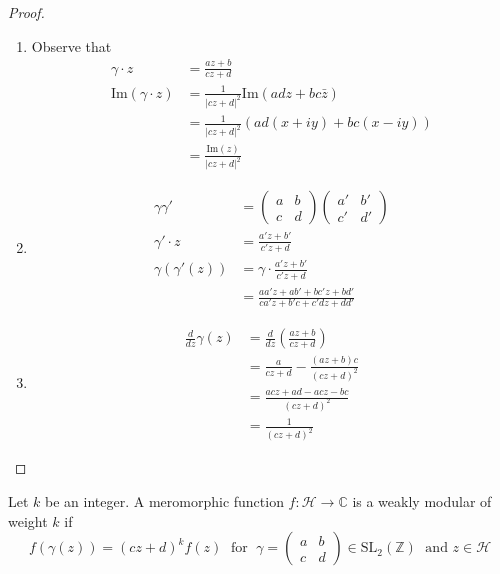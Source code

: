 \documentclass[oneside, 12pt]{scrbook}
\newcommand{\CC}{\mathbb C}
\newcommand{\ZZ}{\mathbb Z}
\newcommand{\SL}{\mathrm{SL}}
\newcommand{\iM}{\mathrm{Im}}
\newcommand{\Hh}{\mathcal{H}}
\theoremstyle{theorem}
\begin{document}
\begin{proof}
\begin{enumerate}
\item Observe that 
\begin{align*}
\gamma \cdot z &= \frac{az+b}{cz+d} \\
\iM(\gamma \cdot z) &= \frac{1}{|cz+d|^2} \iM(adz + bc\bar{z})\\
&= \frac{1}{|cz+d|^2} (ad(x+iy) + bc(x-iy))\\
&= \frac{\iM(z)}{|cz+d|^2}
\end{align*}
\item 
\begin{align*}
\gamma \gamma ' &= \begin{pmatrix}
a & b \\ c & d
\end{pmatrix}\begin{pmatrix}
a' & b' \\ c' & d'
\end{pmatrix} \\
\gamma' \cdot z &= \frac{a'z + b'}{c'z+d} \\
\gamma (\gamma ' (z)) &= \gamma \cdot \frac{a'z + b'}{c'z+d} \\
&= \frac{aa'z + ab' + bc'z + bd'}{ca'z + b'c + c'dz + dd'}
\end{align*}

\item \begin{align*}
\frac{d}{dz} \gamma(z) &= \frac{d}{dz} \left( \frac{az +b}{cz+d} \right)\\
&= \frac{a}{cz+d} - \frac{(az+b)c}{(cz+d)^2} \\
&= \frac{acz + ad - acz - bc}{(cz+d)^2} \\
&= \frac{1}{(cz+d)^2}
\end{align*}
\end{enumerate}
\end{proof}

\begin{definition}
Let $k$ be an integer. A meromorphic function $f: \Hh \rightarrow \CC$ is a weakly modular of weight $k$ if 
\begin{equation*}
f(\gamma(z)) = (cz+d)^k f(z) \; \text{ for }\; \gamma = \begin{pmatrix}
a & b \\ c & d
\end{pmatrix}\in \SL_{2}(\ZZ) \; \text{ and } z \in \Hh
\end{equation*}
\end{definition}
\end{document}
